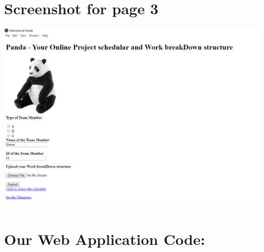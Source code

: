 \documentclass{article}
\begin{document}
\section *{Screenshot for page 3}
\includegraphics[width=20cm]{3.PNG}
\section * {Our Web Application Code:}
\end{document}
